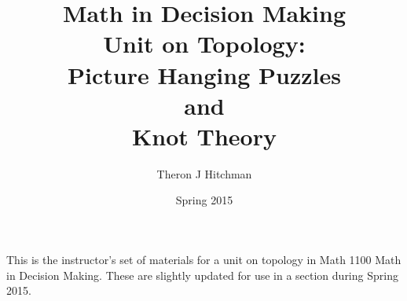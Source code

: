 \documentclass{article}
\begin{document}
\title{Math in Decision Making\\ Unit on Topology:\\ 
Picture Hanging Puzzles\\ and\\ Knot Theory}
\author{Theron J Hitchman}
\date{Spring 2015}

\maketitle

This is the instructor's set of materials for a unit on topology in Math 1100 Math in Decision Making. These are slightly updated for use in a section during Spring 2015.


%


%


%

%


%


%


%



%


%


%




%
%


%


%
\end{document}
